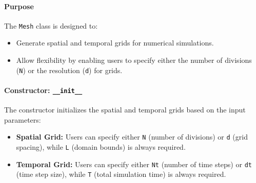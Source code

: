 \documentclass{article}
\begin{document}
			\paragraph{Purpose}
			The \texttt{Mesh} class is designed to:
			\begin{itemize}
				\item Generate spatial and temporal grids for numerical simulations.
				\item Allow flexibility by enabling users to specify either the number of divisions (\texttt{N}) or the resolution (\texttt{d}) for grids.
			\end{itemize}
			\begin{comment}
			
			\paragraph{Attributes}
			\begin{itemize}
				\item \textbf{Spatial Mesh:}
				\begin{itemize}
					\item \texttt{L}: Domain bounds for each spatial dimension (e.g., \texttt{[0, Lx]} for 1D).
					\item \texttt{N}: Number of grid points per dimension.
					\item \texttt{d}: Grid spacing per dimension.
					\item \texttt{x}: Discretized spatial coordinates.
				\end{itemize}
				\item \textbf{Temporal Mesh:}
				\begin{itemize}
					\item \texttt{T}: End time of the simulation.
					\item \texttt{t0}: Initial time (default is 0).
					\item \texttt{Nt}: Number of time steps.
					\item \texttt{dt}: Time step size.
					\item \texttt{t}: Discretized time coordinates.
				\end{itemize}
			\end{itemize}
				content...
			\end{comment}
			\paragraph{Constructor: \texttt{\_\_init\_\_}}
			The constructor initializes the spatial and temporal grids based on the input parameters:
			\begin{itemize}
				\item \textbf{Spatial Grid:} Users can specify either \texttt{N} (number of divisions) or \texttt{d} (grid spacing), while \texttt{L} (domain bounds) is always required.
				\item \textbf{Temporal Grid:} Users can specify either \texttt{Nt} (number of time steps) or \texttt{dt} (time step size), while \texttt{T} (total simulation time) is always required.
			\end{itemize}
			
\end{document}
